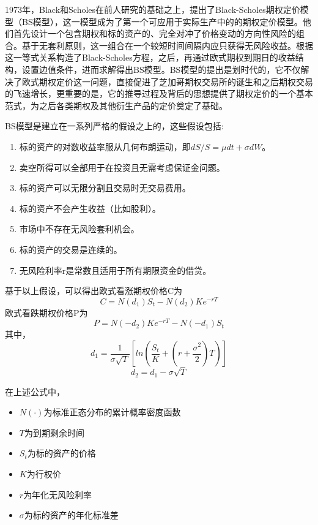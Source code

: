 1973年，Black和Scholes\cite{black1973pricing}在前人研究的基础之上，提出了Black-Scholes期权定价模型（BS模型），这一模型成为了第一个可应用于实际生产中的的期权定价模型。他们首先设计一个包含期权和标的资产的、完全对冲了价格变动的方向性风险的组合。基于无套利原则，这一组合在一个较短时间间隔内应只获得无风险收益。根据这一等式关系构造了Black-Scholes方程，之后，再通过欧式期权到期日的收益结构，设置边值条件，进而求解得出BS模型。BS模型的提出是划时代的，它不仅解决了欧式期权定价这一问题，直接促进了芝加哥期权交易所的诞生和之后期权交易的飞速增长\cite{mackenzie2008engine}，更重要的是，它的推导过程及背后的思想提供了期权定价的一个基本范式，为之后各类期权及其他衍生产品的定价奠定了基础。

BS模型是建立在一系列严格的假设之上的，这些假设包括:

\begin{enumerate}
    \item 标的资产的对数收益率服从几何布朗运动，即$dS/S=\mu dt+\sigma dW$。
    \item 卖空所得可以全部用于在投资且无需考虑保证金问题。
    \item 标的资产可以无限分割且交易时无交易费用。
    \item 标的资产不会产生收益（比如股利）。
    \item 市场中不存在无风险套利机会。
    \item 标的资产的交易是连续的。
    \item 无风险利率r是常数且适用于所有期限资金的借贷。
\end{enumerate}

基于以上假设，可以得出欧式看涨期权价格C为
\begin{equation}
  C=N(d_1)S_t-N(d_2)Ke^{-rT}
\end{equation}
欧式看跌期权价格P为
\begin{equation}
  P=N(-d_2)Ke^{-rT}-N(-d_1)S_t
\end{equation}
其中，
\begin{equation}
  d_1=\frac{1}{\sigma \sqrt{T}}[ln(\frac{S_t}{K}+(r+\frac{\sigma ^2}{2})T)]
\end{equation}
\begin{equation}
  d_2=d_1-\sigma \sqrt{T}
\end{equation}

在上述公式中，

\begin{itemize}
  \item $N(\cdot)$为标准正态分布的累计概率密度函数
  \item $T$为到期剩余时间
  \item $S_t$为标的资产的价格
  \item $K$为行权价
  \item $r$为年化无风险利率
  \item $\sigma$为标的资产的年化标准差
\end{itemize}

